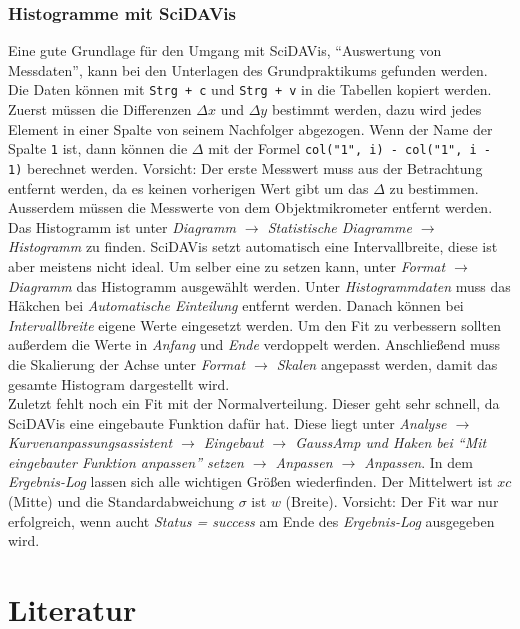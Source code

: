 \documentclass[a4paper, 12pt]{scrartcl}
\begin{document}
\subsubsection*{Histogramme mit SciDAVis}
Eine gute Grundlage für den Umgang mit SciDAVis, ``Auswertung von Messdaten'', kann bei den Unterlagen des Grundpraktikums gefunden werden.\\
Die Daten können mit \verb|Strg + c| und \verb|Strg + v|  in die Tabellen kopiert werden. Zuerst müssen die Differenzen $\Delta x$ und $\Delta y$ bestimmt werden, dazu wird jedes Element in einer Spalte von seinem Nachfolger abgezogen. Wenn der Name der Spalte \verb|1|  ist, dann können die $\Delta$ mit der Formel \verb|col("1", i) - col("1", i - 1)| berechnet werden. Vorsicht: Der erste Messwert muss aus der Betrachtung entfernt werden, da es keinen vorherigen Wert gibt um das $\Delta$ zu bestimmen. Ausserdem müssen die Messwerte von dem Objektmikrometer entfernt werden.\\
Das Histogramm ist unter \emph{Diagramm $\rightarrow$ Statistische Diagramme $\rightarrow$ Histogramm} zu finden. SciDAVis setzt automatisch eine Intervallbreite, diese ist aber meistens nicht ideal. Um selber eine zu setzen kann, unter \emph{Format $\rightarrow$ Diagramm} das Histogramm ausgewählt werden. Unter \emph{Histogrammdaten} muss das Häkchen bei \emph{Automatische Einteilung} entfernt werden. Danach können bei \emph{Intervallbreite} eigene Werte eingesetzt werden. Um den Fit zu verbessern sollten außerdem die Werte in \emph{Anfang} und \emph{Ende} verdoppelt werden. Anschließend muss die Skalierung der Achse unter \emph{Format $\rightarrow$ Skalen} angepasst werden, damit das gesamte Histogram dargestellt wird. \\
Zuletzt fehlt noch ein Fit mit der Normalverteilung. Dieser geht sehr schnell, da SciDAVis eine eingebaute Funktion dafür hat. Diese liegt unter \emph{Analyse $\rightarrow$ Kurvenanpassungsassistent $\rightarrow$ Eingebaut $\rightarrow$ GaussAmp und Haken bei ``Mit eingebauter Funktion anpassen'' setzen $\rightarrow$ Anpassen $\rightarrow$ Anpassen}. In dem \emph{Ergebnis-Log} lassen sich alle wichtigen Größen wiederfinden. Der Mittelwert ist $xc$ (Mitte) und die Standardabweichung $\sigma$ ist $w$ (Breite). Vorsicht: Der Fit war nur erfolgreich, wenn aucht \emph{Status = success} am Ende des \emph{Ergebnis-Log} ausgegeben wird.


\section*{Literatur}
\end{document}
